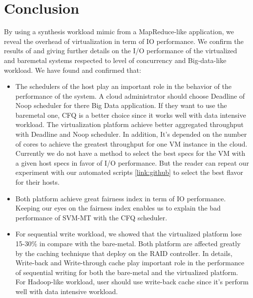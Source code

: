 \documentclass{acmsig}
\begin{document}





\section{Conclusion}
By using a synthesis workload mimic from a MapReduce-like application, we reveal the overhead of virtualization in term of IO performance. We confirm the results of \cite{khoa13,boutcher10} and giving further details on the I/O performance of the virtualized and baremetal systems respected to level of concurrency and Big-data-like workload. We have found and confirmed that:
\begin{itemize}
  \item The schedulers of the host play an important role in the behavior of the performance of the system. A cloud administrator should choose Deadline of Noop scheduler for there Big Data application. If they want to use the baremetal one, CFQ is a better choice since it works well with data intensive workload. The virtualization platform achieve better aggregated throughput with Deadline and Noop scheduler. In addition, It's depended on the number of cores to achieve the greatest throughput for one VM instance in the cloud. Currently we do not have a method to select the best specs for the VM with a given host specs in favor of I/O performance. But the reader can repeat our experiment with our automated scripts \ref{link:github} to select the best flavor for their hosts.
  \item Both platform achieve great fairness index in term of IO performance. Keeping our eyes on the fairness index enables us to explain the bad performance of SVM-MT with the CFQ scheduler.
  \item For sequential write workload, we showed that the virtualized platform lose 15-30\% in compare with the bare-metal. Both platform are affected greatly by the caching technique that deploy on the RAID controller. In details, Write-back and Write-through cache play important role in the performance of sequential writing for both the bare-metal and the virtualized platform. For Hadoop-like workload, user should use write-back cache since it's perform well with data intensive workload.
\end{itemize}
\end{document}
